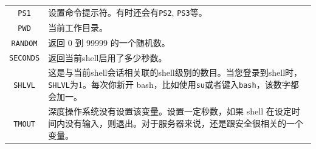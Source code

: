 \documentclass[doctor,openright,twoside]{sjtuthesis}
\newcommand{\passthrough}[1]{#1}
\theoremstyle{plain}
\theoremstyle{definition}
\theoremstyle{remark}
\theoremstyle{ocrenumbox}
\theoremstyle{plain}
\begin{document}
\begin{longtable}[]{@{}cl@{}}
\begin{minipage}[t]{0.23\columnwidth}
\passthrough{\lstinline!PS1!}\strut
\end{minipage} & \begin{minipage}[t]{0.72\columnwidth}\raggedright
设置命令提示符。有时还会有\passthrough{\lstinline!PS2!},
\passthrough{\lstinline!PS3!}等。\strut
\end{minipage}\tabularnewline
\begin{minipage}[t]{0.23\columnwidth}\centering
\passthrough{\lstinline!PWD!}\strut
\end{minipage} & \begin{minipage}[t]{0.72\columnwidth}\raggedright
当前工作目录。\strut
\end{minipage}\tabularnewline
\begin{minipage}[t]{0.23\columnwidth}\centering
\passthrough{\lstinline!RANDOM!}\strut
\end{minipage} & \begin{minipage}[t]{0.72\columnwidth}\raggedright
返回 0 到 99999 的一个随机数。\strut
\end{minipage}\tabularnewline
\begin{minipage}[t]{0.23\columnwidth}\centering
\passthrough{\lstinline!SECONDS!}\strut
\end{minipage} & \begin{minipage}[t]{0.72\columnwidth}\raggedright
返回当前shell启用了多少秒数。\strut
\end{minipage}\tabularnewline
\begin{minipage}[t]{0.23\columnwidth}\centering
\passthrough{\lstinline!SHLVL!}\strut
\end{minipage} & \begin{minipage}[t]{0.72\columnwidth}\raggedright
这是与当前shell会话相关联的shell级别的数目。当您登录到shell时，\passthrough{\lstinline!SHLVL!}为1。每次你新开
bash，比如使用\passthrough{\lstinline!su!}或者键入\passthrough{\lstinline!bash!}，该数字都会加一。\strut
\end{minipage}\tabularnewline
\begin{minipage}[t]{0.23\columnwidth}\centering
\passthrough{\lstinline!TMOUT!}\strut
\end{minipage} & \begin{minipage}[t]{0.72\columnwidth}\raggedright
深度操作系统没有设置该变量。设置一定秒数，如果 shell
在设定时间内没有输入，则退出。对于服务器来说，还是跟安全很相关的一个变量。\strut
\end{minipage}\tabularnewline
\bottomrule
\end{longtable}
\end{document}
